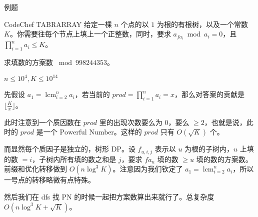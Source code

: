 \documentclass[UTF8]{beamer}
\begin{document}
    \begin{frame}{例题}
        \begin{block}{CodeChef TABRARRAY}
            给定一棵 $n$ 个点的以 $1$ 为根的有根树，以及一个常数 $K$。你需要往每个节点上填上一个正整数，同时，要求 $a_{fa_i}\bmod a_i=0$，且 $\prod_{i=1}^na_i\le K$。

            求填数的方案数 $\bmod 998244353$。

            $n\le 10^4,K\le 10^{14}$
        \end{block}
    \end{frame}

    \begin{frame}
        先假设 $a_1=\operatorname{lcm}_{i=2}^na_i$，若当前的 $prod=\prod_{i=1}^na_i=x$，那么对答案的贡献是 $\lfloor\frac{K}{x}\rfloor$。
        
        $\ $\\

        此时注意到一个质因数在 $prod$ 里的出现次数要么为 $0$，要么 $\ge 2$，也就是说，此时的 $prod$ 是一个 $\text{Powerful Number}$。这样的 $prod$ 只有 $O(\sqrt{K})$ 个。
        \pause

        $\ $\\
        
        而显然每个质因子是独立的，树形 DP。设 $f_{u,i,j}$ 表示以 $u$ 为根的子树内，$u$ 上填的数 $=i$，子树内所有填的数之和是 $j$，要求 $fa_u$ 填的数 $\ge u$ 填的数的方案数。前缀和优化转移做到 $O(n\log^3 K)$。注意因为我们钦定了 $a_1=\operatorname{lcm}_{i=2}^na_i$，所以一号点的转移略微有点特殊。

        $\ $\\

        然后我们在 dfs 找 $\text{PN}$ 的时候一起把方案数算出来就行了。总复杂度 $O(n\log^3K+\sqrt{K})$。
    \end{frame}
\end{document}
